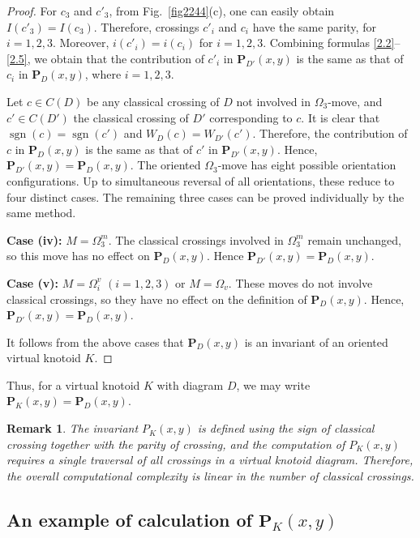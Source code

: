 \documentclass[10pt,a4paper]{amsart}
\newtheorem{remark}{Remark}[section]
\numberwithin{equation}{section}
\numberwithin{equation}{section}
\begin{document}
\begin{proof}
	For $c_3$ and $c'_3$, from Fig.~\ref{fig2244}(c), one can easily obtain $I(c'_3) = I(c_3)$. Therefore, crossings $c'_i$ and $c_i$ have the same parity, for $i=1, 2, 3$. Moreover, $i(c'_i) = i(c_i)$ for $i=1, 2, 3$. Combining formulas \eqref{2.2}--\eqref{2.5}, we obtain that the contribution of $c'_i$ in $\mathbf{P}_{D'}(x,y)$ is the same as that of $c_i$ in $\mathbf{P}_{D}(x,y)$, where $i=1, 2, 3$. 
	
	Let $c\in C(D)$ be any classical crossing of $D$ not involved in $\Omega_3$-move, and $c'\in C(D')$ the classical crossing of $D'$ corresponding to $c$. It is clear that $\operatorname{sgn}(c)=\operatorname{sgn}(c')$ and $W_D(c)=W_{D'}(c')$. Therefore, the contribution of $c$ in $\mathbf{P}_D(x,y)$ is the same as that of $c'$ in $\mathbf{P}_{D'}(x,y)$. Hence, $\mathbf{P}_{D'}(x,y)=\mathbf{P}_D(x,y).$ The oriented $\Omega_3$-move has eight possible orientation configurations. Up to simultaneous reversal of all orientations, these reduce to four distinct cases. The remaining three cases can be proved individually by the same method.
	
	\noindent
	\textbf{Case (iv):} $M = \Omega^{m}_3$. The classical crossings involved in $\Omega^{m}_3$ remain unchanged, so this move has no effect on $\mathbf{P}_D(x,y)$. Hence $\mathbf{P}_{D'}(x,y) = \mathbf{P}_D(x,y)$.
	
	\noindent
	\textbf{Case (v):} $M = \Omega^{v}_i$ $(i=1,2,3)$ or $M = \Omega_v$. These moves do not involve classical crossings, so they have no effect on the definition of $\mathbf{P}_D(x,y)$. Hence, $\mathbf{P}_{D'}(x,y)=\mathbf{P}_D(x,y)$.
	
	It follows from the above cases that $\mathbf{P}_D(x,y)$ is an invariant of an oriented virtual knotoid $K$.
\end{proof}
Thus, for a virtual knotoid $K$ with diagram $D$, we may write $\mathbf{P}_K(x,y)=\mathbf{P}_D(x,y)$. 

\begin{remark}
	{\rm
		The invariant $P_K(x,y)$ is defined using the sign of classical crossing together with the parity of crossing, and the computation of $P_K(x,y)$ requires a single traversal of all crossings in a virtual knotoid diagram. Therefore, the overall computational complexity is linear in the number of classical crossings.
	}	
\end{remark}

\subsection{An example of calculation of $\mathbf{P}_K(x,y)$}
\end{document}
